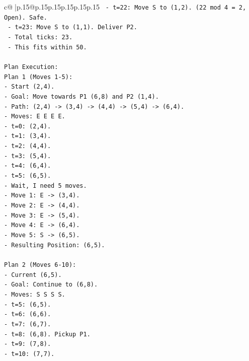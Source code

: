 \documentclass{article}
\begin{document}
{\begin{supertabular}{c@{$\;$}|p{.15\linewidth}@{}p{.15\linewidth}p{.15\linewidth}p{.15\linewidth}p{.15\linewidth}p{.15\linewidth}}
{{{\texttt{      {-} t=22: Move S to (1,2). (22 mod 4 = 2, Open). Safe.} \\
\texttt{      {-} t=23: Move S to (1,1). Deliver P2.} \\
\texttt{    {-} Total ticks: 23.} \\
\texttt{    {-} This fits within 50.} \\
\\ 
\texttt{Plan Execution:} \\
\texttt{Plan 1 (Moves 1{-}5):} \\
\texttt{{-} Start (2,4).} \\
\texttt{{-} Goal: Move towards P1 (6,8) and P2 (1,4).} \\
\texttt{{-} Path: (2,4) {-}> (3,4) {-}> (4,4) {-}> (5,4) {-}> (6,4).} \\
\texttt{{-} Moves: E E E E.} \\
\texttt{{-} t=0: (2,4).} \\
\texttt{{-} t=1: (3,4).} \\
\texttt{{-} t=2: (4,4).} \\
\texttt{{-} t=3: (5,4).} \\
\texttt{{-} t=4: (6,4).} \\
\texttt{{-} t=5: (6,5).} \\
\texttt{{-} Wait, I need 5 moves.} \\
\texttt{{-} Move 1: E {-}> (3,4).} \\
\texttt{{-} Move 2: E {-}> (4,4).} \\
\texttt{{-} Move 3: E {-}> (5,4).} \\
\texttt{{-} Move 4: E {-}> (6,4).} \\
\texttt{{-} Move 5: S {-}> (6,5).} \\
\texttt{{-} Resulting Position: (6,5).} \\
\\ 
\texttt{Plan 2 (Moves 6{-}10):} \\
\texttt{{-} Current (6,5).} \\
\texttt{{-} Goal: Continue to (6,8).} \\
\texttt{{-} Moves: S S S S.} \\
\texttt{{-} t=5: (6,5).} \\
\texttt{{-} t=6: (6,6).} \\
\texttt{{-} t=7: (6,7).} \\
\texttt{{-} t=8: (6,8). Pickup P1.} \\
\texttt{{-} t=9: (7,8).} \\
\texttt{{-} t=10: (7,7).} \\
}}}
\end{supertabular}}
\end{document}
